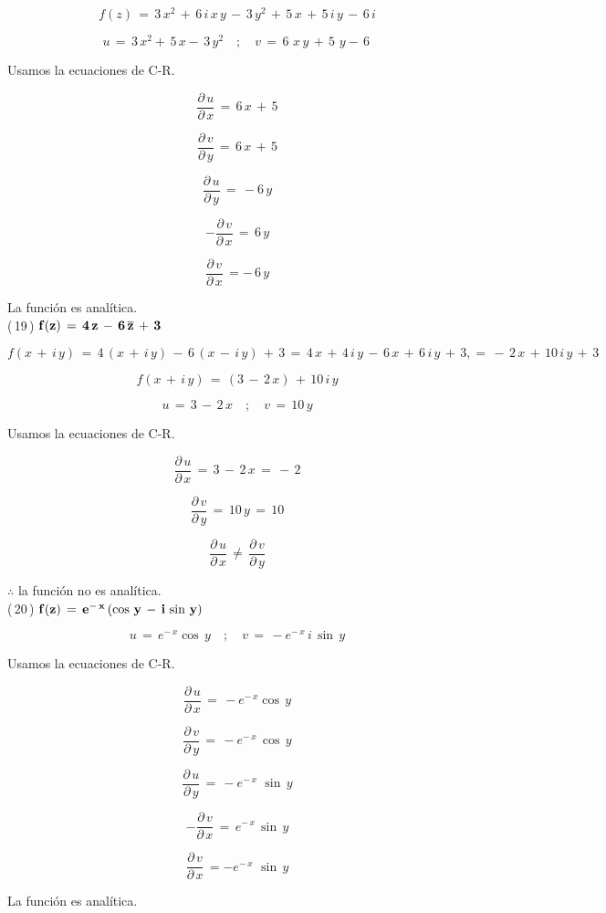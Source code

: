 \documentclass[a4paper,11pt,openany]{book}
\begin{document}
$$f(z)\,= \,3\,x^{2}\,+\,6\,i\,x\,y\,-\,3\,y^{2}\,+\,5\,x\,+\,5\,i\,y\,-\,6\,i$$

$$u\,=\,3\,x^{2}+\,5\,x-\,3\,y^{2} \quad;\quad v\,=\,6\,\,x\,y\,+\,5\,\,y-\,6\,$$

\textcolor{ao(english)}{} Usamos la ecuaciones de C-R.

$$\dfrac{\partial\,u}{\partial\,x}\,=\,6\,x\,+\,5$$

$$\dfrac{\partial\,v}{\partial\,y}\,=\,6\,x\,+\,5$$

$$\dfrac{\partial\,u}{\partial\,y}\,=\,-6\,y$$

$$-\dfrac{\partial\,v}{\partial\,x}\,=\,6\,y$$

$$\dfrac{\partial\,v}{\partial\,x}\,=-\,6\,y$$

La función es analítica.\\

\textcolor{ao(english)}{(\,19\,)} $\bf{f(z)\,=\,4\,z\,-\,6\,\overline{z}\,+\,3}$

$$f(x\,+\,i\,y)\,=\,4\,(x\,+\,i\,y)\,-\,6\,(x\,-\,i\,y)\,+\,3\,=\,4\,x\,+\,4\,i\,y\,-\,6\,x\,+\,6\,i\,y\,+\,3,=\,-\,2\,x\,+\,10\,i\,y\,+\,3$$

$$f(x\,+\,i\,y)\,=\,(3\,-\,2\,x)\,+\,10\,i\,y$$

$$u\,=\,3\,-\,2\,x \quad;\quad v\,=\,10\,y$$

\newpage

\textcolor{ao(english)}{} Usamos la ecuaciones de C-R.

$$\dfrac{\partial\,u}{\partial\,x}\,=\,3\,-\,2\,x\,=\,-\,2$$

$$\dfrac{\partial\,v}{\partial\,y}\,=\,10\,y\,=\,10$$

$$\dfrac{\partial\,u}{\partial\,x}\,\neq\,\dfrac{\partial\,v}{\partial\,y}$$

$\therefore$ la función no es analítica.\\

\textcolor{ao(english)}{(\,20\,)} $\bf{f(z)\,=\,e^{-\,x}\,(\cos\,y\,-\,i\,\sin\,y)}$

$$u\,=\,e^{-\,x}\cos\,y \quad;\quad v\,=\,-e^{-\,x}\,i\,\sin\,y$$

\textcolor{ao(english)}{} Usamos la ecuaciones de C-R.

$$\dfrac{\partial\,u}{\partial\,x}\,=\,-e^{-\,x}\cos\,y$$

$$\dfrac{\partial\,v}{\partial\,y}\,=\,-e^{-\,x}\,\cos\,y$$

$$\dfrac{\partial\,u}{\partial\,y}\,=\,-e^{-\,x}\,\,\sin\,y$$

$$-\dfrac{\partial\,v}{\partial\,x}\,=\,e^{-\,x}\,\sin\,y$$

$$\dfrac{\partial\,v}{\partial\,x}\,=-e^{-\,x}\,\,\sin\,y$$

La función es analítica.\\
\end{document}
